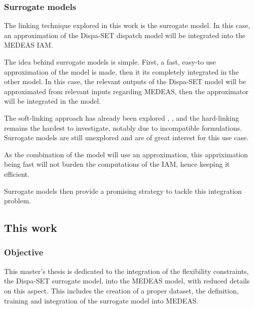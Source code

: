 \subsubsection{Surrogate models}

The linking technique explored in this work is the surrogate model. In this case, an approximation of the Dispa-SET dispatch model will be integrated into the MEDEAS IAM. 

The idea behind surrogate models is simple. First, a fast, easy-to use approximation of the model is made, then it its completely integrated in the other model. In this case, the relevant outputs of the Dispa-SET model will be approximated from relevant inputs regarding MEDEAS, then the approximator will be integrated in the model.

The soft-linking approach has already been explored \cite{Brinkerink2022-softlink}, \cite{DEane2012-softlink}, and the hard-linking remains the hardest to investigate, notably due to incompatible formulations. Surrogate models are still unexplored and are of great interest for this use case.

As the combination of the model will use an approximation, this appriximation being fast will not burden the computations of the IAM, hence keeping it efficient.

Surrogate models then provide a promising strategy to tackle this integration problem.

\subsection{This work}

\subsubsection{Objective}

This master's thesis is dedicated to the integration of the flexibility constraints, the Dispa-SET surrogate model, into the MEDEAS model, with reduced details on this aspect. This includes the creation of a proper dataset, the definition, training and integration of the surrogate model into MEDEAS.



